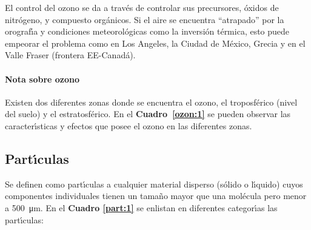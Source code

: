 El control del ozono se da a trav\'es de controlar sus precursores, \'oxidos de nitr\'ogeno, y compuesto org\'anicos. Si el aire se encuentra ``atrapado'' por la
orograf\'{\i}a y condiciones meteorol\'ogicas como la inversi\'on t\'ermica, esto puede empeorar el problema como en  Los Angeles, la Ciudad de M\'exico, Grecia y en el Valle Fraser (frontera EE-Canad\'a).

\paragraph{Nota sobre ozono}
Existen dos diferentes zonas donde se encuentra el ozono, el troposf\'erico (nivel del suelo) y el estratosf\'erico. En el \textbf{Cuadro~\ref{ozon:1}} se pueden observar las
caracter\'{\i}sticas y efectos que posee el ozono en las diferentes zonas.



\subsection{Part\'{\i}culas}
Se definen como part\'{\i}culas a cualquier material disperso (s\'olido o l\'{\i}quido) cuyos componentes individuales tienen un tama\~no mayor que una mol\'e\-cula pero menor a \SI{500}{\micro\metre}.  En el \textbf{Cuadro \ref{part:1}}  se enlistan en diferentes categor\'{\i}as las part\'{\i}culas:

